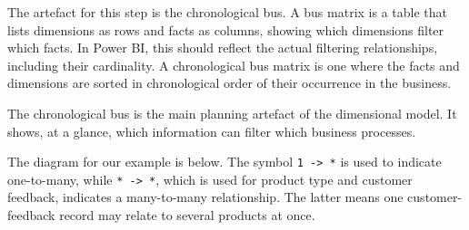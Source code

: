 \documentclass[10pt,openany,10pt]{book}
\begin{document}
The artefact for this step is the chronological bus. A bus matrix is a
table that lists dimensions as rows and facts as columns, showing which
dimensions filter which facts. In Power BI, this should reflect the
actual filtering relationships, including their cardinality. A
chronological bus matrix is one where the facts and dimensions are
sorted in chronological order of their occurrence in the business.

The chronological bus is the main planning artefact of the dimensional
model. It shows, at a glance, which information can filter which
business processes.

The diagram for our example is below. The symbol
\texttt{1\ -\textgreater{}\ *} is used to indicate one-to-many, while
\texttt{*\ -\textgreater{}\ *}, which is used for product type and
customer feedback, indicates a many-to-many relationship. The latter
means one customer-feedback record may relate to several products at
once.
\end{document}
